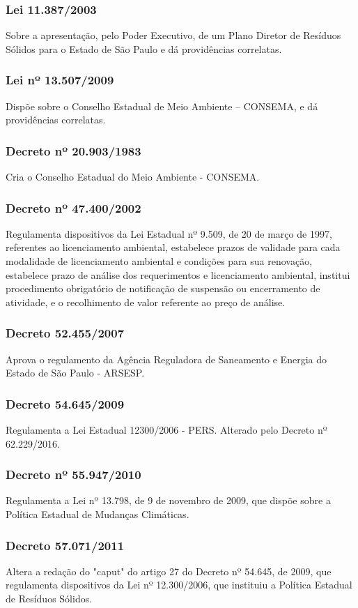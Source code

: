 \begin{subapend}
\begin{subsubapend}
		\subsubsection{Lei 11.387/2003}
		Sobre a apresentação, pelo Poder Executivo, de um Plano Diretor de Resíduos Sólidos para o Estado de São Paulo e dá providências correlatas.
		\subsubsection{Lei nº 13.507/2009}
		Dispõe sobre o Conselho Estadual de Meio Ambiente – CONSEMA, e dá providências correlatas.
		\subsubsection{Decreto nº 20.903/1983}
		Cria o Conselho Estadual do Meio Ambiente - CONSEMA.
		\subsubsection{Decreto nº 47.400/2002}
		Regulamenta dispositivos da Lei Estadual nº 9.509, de 20 de março de 1997, referentes ao licenciamento ambiental, estabelece prazos de validade para cada modalidade de licenciamento ambiental e condições para sua renovação, estabelece prazo de análise dos requerimentos e licenciamento ambiental, institui procedimento obrigatório de notificação de suspensão ou encerramento de atividade, e o recolhimento de valor referente ao preço de análise.
		\subsubsection{Decreto 52.455/2007}
		Aprova o regulamento da Agência Reguladora de Saneamento e Energia do Estado de São Paulo - ARSESP.
		\subsubsection{Decreto 54.645/2009}
		Regulamenta a Lei Estadual 12300/2006 - PERS. Alterado pelo Decreto nº 62.229/2016.
		\subsubsection{Decreto nº 55.947/2010}
		Regulamenta a Lei nº 13.798, de 9 de novembro de 2009, que dispõe sobre a Política Estadual de Mudanças Climáticas.
		\subsubsection{Decreto 57.071/2011}
		Altera a redação do "caput" do artigo 27 do Decreto nº 54.645, de 2009, que regulamenta dispositivos da Lei nº 12.300/2006, que instituiu a Política Estadual de Resíduos Sólidos.

\end{subsubapend}
\end{subapend}
